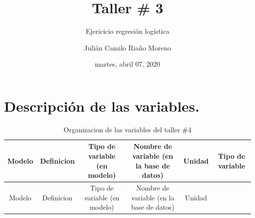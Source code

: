 \documentclass[
]{article}
\title{Taller \# 3}
\subtitle{Ejericicio regresión logística}
\author{Julián Camilo Riaño Moreno}
\date{martes, abril 07, 2020}
\begin{document}
\maketitle

{
\setcounter{tocdepth}{3}
\tableofcontents
}
\hypertarget{descripciuxf3n-de-las-variables.}{%
\section{Descripción de las
variables.}\label{descripciuxf3n-de-las-variables.}}

\begin{longtable}[]{@{}cccccc@{}}
\caption{Organizacion de las variables del taller \#4}\tabularnewline
\toprule
\begin{minipage}[b]{0.07\columnwidth}\centering
Modelo\strut
\end{minipage} & \begin{minipage}[b]{0.13\columnwidth}\centering
Definicion\strut
\end{minipage} & \begin{minipage}[b]{0.17\columnwidth}\centering
Tipo de variable (en modelo)\strut
\end{minipage} & \begin{minipage}[b]{0.18\columnwidth}\centering
Nombre de variable (en la base de datos)\strut
\end{minipage} & \begin{minipage}[b]{0.15\columnwidth}\centering
Unidad\strut
\end{minipage} & \begin{minipage}[b]{0.13\columnwidth}\centering
Tipo de variable\strut
\end{minipage}\tabularnewline
\midrule
\endfirsthead
\toprule
\begin{minipage}[b]{0.07\columnwidth}\centering
Modelo\strut
\end{minipage} & \begin{minipage}[b]{0.13\columnwidth}\centering
Definicion\strut
\end{minipage} & \begin{minipage}[b]{0.17\columnwidth}\centering
Tipo de variable (en modelo)\strut
\end{minipage} & \begin{minipage}[b]{0.18\columnwidth}\centering
Nombre de variable (en la base de datos)\strut
\end{minipage} & \begin{minipage}[b]{0.15\columnwidth}\centering
Unidad\strut
\end{minipage} & \begin{minipage}[b]{0.13\columnwidth}\centering

\end{minipage}
\end{longtable}
\end{document}
